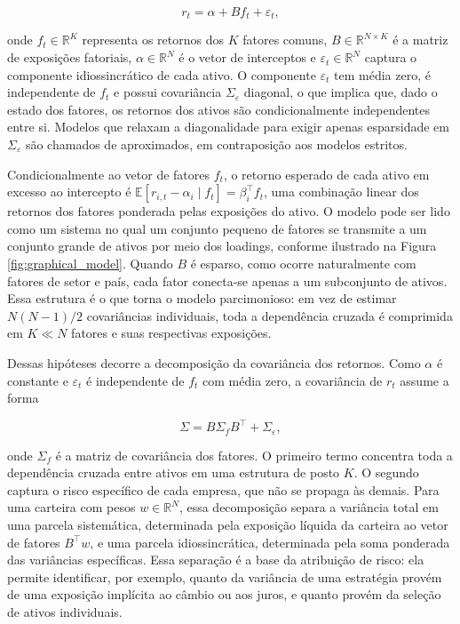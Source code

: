 \begin{equation}
    r_t = \alpha + B f_t + \varepsilon_t,
\end{equation}

onde $f_t \in \mathbb{R}^K$ representa os retornos dos $K$ fatores comuns, $B \in \mathbb{R}^{N \times K}$ é a matriz de exposições fatoriais, $\alpha \in \mathbb{R}^N$ é o vetor de interceptos e $\varepsilon_t \in \mathbb{R}^N$ captura o componente idiossincrático de cada ativo. O componente $\varepsilon_t$ tem média zero, é independente de $f_t$ e possui covariância $\Sigma_\varepsilon$ diagonal, o que implica que, dado o estado dos fatores, os retornos dos ativos são condicionalmente independentes entre si. Modelos que relaxam a diagonalidade para exigir apenas esparsidade em $\Sigma_\varepsilon$ são chamados de aproximados, em contraposição aos modelos estritos.

Condicionalmente ao vetor de fatores $f_t$, o retorno esperado de cada ativo em excesso ao intercepto é $\mathbb{E}[r_{i,t} - \alpha_i \mid f_t] = \beta_i^\top f_t$, uma combinação linear dos retornos dos fatores ponderada pelas exposições do ativo. O modelo pode ser lido como um sistema no qual um conjunto pequeno de fatores se transmite a um conjunto grande de ativos por meio dos loadings, conforme ilustrado na Figura \ref{fig:graphical_model}. Quando $B$ é esparso, como ocorre naturalmente com fatores de setor e país, cada fator conecta-se apenas a um subconjunto de ativos. Essa estrutura é o que torna o modelo parcimonioso: em vez de estimar $N(N-1)/2$ covariâncias individuais, toda a dependência cruzada é comprimida em $K \ll N$ fatores e suas respectivas exposições.



Dessas hipóteses decorre a decomposição da covariância dos retornos. Como $\alpha$ é constante e $\varepsilon_t$ é independente de $f_t$ com média zero, a covariância de $r_t$ assume a forma

\begin{equation}
    \Sigma = B \Sigma_f B^\top + \Sigma_\varepsilon,
\end{equation}

onde $\Sigma_f$ é a matriz de covariância dos fatores. O primeiro termo concentra toda a dependência cruzada entre ativos em uma estrutura de posto $K$. O segundo captura o risco específico de cada empresa, que não se propaga às demais. Para uma carteira com pesos $w \in \mathbb{R}^N$, essa decomposição separa a variância total em uma parcela sistemática, determinada pela exposição líquida da carteira ao vetor de fatores $B^\top w$, e uma parcela idiossincrática, determinada pela soma ponderada das variâncias específicas. Essa separação é a base da atribuição de risco: ela permite identificar, por exemplo, quanto da variância de uma estratégia provém de uma exposição implícita ao câmbio ou aos juros, e quanto provém da seleção de ativos individuais.


